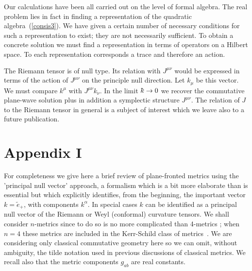 \documentclass[12pt,a4paper]{article}
\newcounter{eg}
\def\t#1{\tilde #1}
\def\kbar{{\mathchar'26\mkern-9muk}}
\newcommand{\initiate}{\setcounter{equation}{0}}
\begin{document}
Our calculations have been all carried out on the level of formal
algebra. The real problem lies in fact in finding a representation of
the quadratic algebra~(\ref{consis3}). We have given a certain number
of necessary conditions for such a representation to exist; they are
not necessarily sufficient.  To obtain a concrete solution we must
find a representation in terms of operators on a Hilbert space.  To
each representation corresponds a trace and therefore an action.

The Riemann tensor is of null type. Its relation with $J^{\mu\nu}$
would be expressed in terms of the action of $J^{\mu\nu}$ on the
principle null direction. Let $k_\mu$ be this vector. We must compare
$k^\mu$ with $J^{\mu\nu}k_\nu$.  In the limit $\kbar \to 0$ we
recover the commutative plane-wave solution plus in addition a
symplectic structure $J^{\mu\nu}$.  The relation of $J$ to the Riemann
tensor in general is a subject of interest which we leave also to a
future publication.


\appendix

\initiate
\section*{Appendix I}
\setcounter{section}{1}

\renewcommand{\thesection}{\Roman{section}}

For completeness we give here a brief review of plane-fronted metrics
using the 'principal null vector' approach, a formalism which is a bit
more elaborate than is essential but which explicitly identifies, from
the beginning, the important vector $k = \t{e_+}$, with components
$k^{\alpha}$. In special cases $k$ can be identified as a principal
null vector of the Riemann or Weyl (conformal) curvature tensors. We
shall consider $n$-metrics since to do so is no more complicated than
4-metrics ; when $n=4$ these metrics are included in the Kerr-Schild
class of metrics~\cite{KraSteMacHer80}.  We are considering only classical
commutative geometry here so we can omit, without ambiguity, the tilde
notation used in previous discussions of classical metrics. We recall
also that the metric components $g_{ab}$ are real constants.
\end{document}
